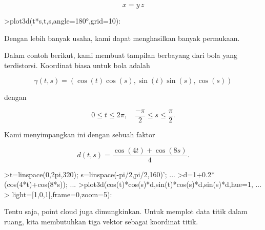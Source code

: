 \documentclass{article}
\begin{document}
\begin{eulernotebook}
\begin{eulercomment}
\begin{eulercomment}
\begin{eulercomment}
\begin{eulercomment}
\begin{eulercomment}
\begin{eulercomment}
\begin{eulercomment}
\begin{eulercomment}
\begin{eulercomment}
\begin{eulercomment}
\begin{eulercomment}
\end{eulercomment}
\begin{eulerformula}
\[
x = y \, z
\]
\end{eulerformula}
\begin{eulerprompt}
>plot3d(t*s,t,s,angle=180°,grid=10):
\end{eulerprompt}
\begin{eulercomment}
Dengan lebih banyak usaha, kami dapat menghasilkan banyak permukaan.

Dalam contoh berikut, kami membuat tampilan berbayang dari bola yang
terdistorsi. Koordinat biasa untuk bola adalah

\end{eulercomment}
\begin{eulerformula}
\[
\gamma(t,s) = (\cos(t)\cos(s),\sin(t)\sin(s),\cos(s))
\]
\end{eulerformula}
\begin{eulercomment}
dengan

\end{eulercomment}
\begin{eulerformula}
\[
0 \le t \le 2\pi, \quad \frac{-\pi}{2} \le s \le \frac{\pi}{2}.
\]
\end{eulerformula}
\begin{eulercomment}
Kami menyimpangkan ini dengan sebuah faktor

\end{eulercomment}
\begin{eulerformula}
\[
d(t,s) = \frac{\cos(4t)+\cos(8s)}{4}.
\]
\end{eulerformula}
\begin{eulerprompt}
>t=linspace(0,2pi,320); s=linspace(-pi/2,pi/2,160)'; ...
>d=1+0.2*(cos(4*t)+cos(8*s)); ...
>plot3d(cos(t)*cos(s)*d,sin(t)*cos(s)*d,sin(s)*d,hue=1, ...
>  light=[1,0,1],frame=0,zoom=5):
\end{eulerprompt}
\begin{eulercomment}
Tentu saja, point cloud juga dimungkinkan. Untuk memplot data titik
dalam ruang, kita membutuhkan tiga vektor sebagai koordinat titik.


\end{eulercomment}
\end{eulercomment}
\end{eulercomment}
\end{eulercomment}
\end{eulercomment}
\end{eulercomment}
\end{eulercomment}
\end{eulercomment}
\end{eulercomment}
\end{eulercomment}
\end{eulercomment}
\end{eulernotebook}
\end{document}
